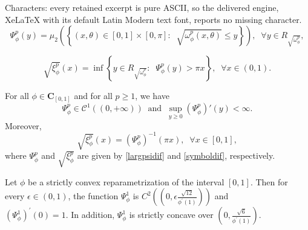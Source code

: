 \documentclass[10pt,a4paper]{amsart}
\begin{document}
Characters: every retained excerpt is pure ASCII, so the delivered engine, XeLaTeX with its default Latin Modern text font, reports no missing character.
\begin{equation}\label{largpsidif}
    \Psi_{\phi}^{p}(y)=\mu_{2} \left( \left\{  (x,\theta)\in [0,1]\times[0,\pi]:\;\; \sqrt{\omega_{\phi}^p(x,\theta)}\leq y    \right\} \right),\;\;\forall y\in  R_{\sqrt{\omega_{\phi}^p}},
\end{equation}

\begin{equation}\label{symboldif}
  \sqrt{\xi_{\phi}^p}(x)=\inf\left\{ y\in   R_{\sqrt{\omega_{\phi}^p}}:\;\; \Psi_{\phi}^{p}(y)>\pi  x  \right\},\;\;\forall x\in(0,1).  
\end{equation}

\begin{proposition}\label{stefa}
For all  $\phi\in \mathbf{C}_{[0,1]}$ and for all $p\geq 1$, we have 
$$
\Psi_{\phi}^{p}\in \mathcal{C}^1((0,+\infty))\;\;\text{and} \;\; \sup_{y \geq 0} \left(\Psi^{p}_{\phi}\right)'(y)<\infty.
$$ 
Moreover,
\begin{equation}\label{relatioxiandPsi}
   \sqrt{\xi_{\phi}^p}(x)=\left(\Psi_{\phi}^{p}\right)^{-1}(\pi x),\;\;\forall x \in [0,1],
\end{equation}
where $\Psi_{\phi}^{p}$ and $\sqrt{\xi_{\phi}^p}$ are given by \eqref{largpsidif} and \eqref{symboldif}, respectively.
\end{proposition}

\begin{proposition}\label{propc}
Let $\phi$ be a strictly convex reparametrization of the interval $[0,1]$. Then for every $\epsilon\in(0,1)$, the function $\Psi_{\phi}^{1}$ is $C^{2}\left(\left(0,\epsilon\frac{\sqrt{12}}{\phi^{'}(1)}  \right) \right)$ and \\ $\left(\Psi_{\phi}^{1}\right)^{'}(0)=1$. In addition, $\Psi_{\phi}^{1}$ is strictly concave over $\left(0,\frac{\sqrt{6}}{\phi^{'}(1)}\right)$.
\end{proposition}
\end{document}

